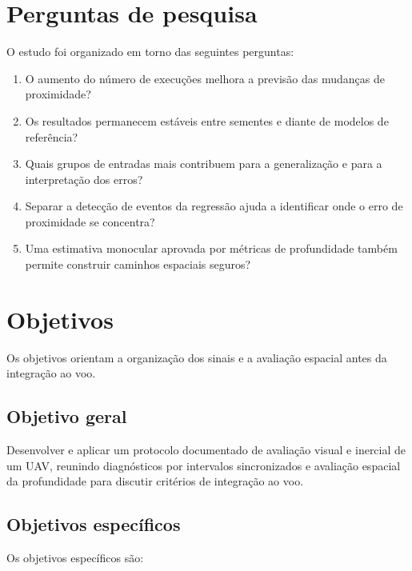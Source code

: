 \section{Perguntas de pesquisa}

O estudo foi organizado em torno das seguintes perguntas:

\begin{enumerate}
    \item O aumento do número de execuções melhora a previsão das mudanças de proximidade?
    \item Os resultados permanecem estáveis entre sementes e diante de modelos de referência?
    \item Quais grupos de entradas mais contribuem para a generalização e para a interpretação dos erros?
    \item Separar a detecção de eventos da regressão ajuda a identificar onde o erro de proximidade se concentra?
    \item Uma estimativa monocular aprovada por métricas de profundidade também permite construir caminhos espaciais seguros?
\end{enumerate}

\section{Objetivos}

Os objetivos orientam a organização dos sinais e a avaliação espacial antes da integração ao voo.

\subsection{Objetivo geral}

Desenvolver e aplicar um protocolo documentado de avaliação visual e inercial de um UAV, reunindo diagnósticos por intervalos sincronizados e avaliação espacial da profundidade para discutir critérios de integração ao voo.

\subsection{Objetivos específicos}

Os objetivos específicos são:


